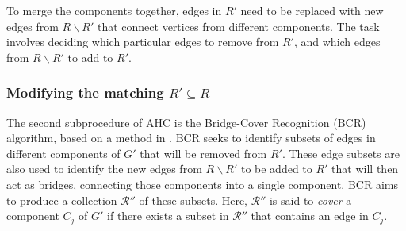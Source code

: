 \documentclass[a4paper,11pt,authoryear]{elsarticle}
\begin{document}
To merge the components together, edges in $R'$ need to be replaced with new edges from $R \backslash R'$ that connect vertices from different components. The task involves deciding which particular edges to remove from $R'$, and which edges from $R \backslash R'$ to add to $R'$.

\subsubsection{Modifying the matching $R' \subseteq R$}
\label{subsub:bcr}
\noindent The second subprocedure of AHC is the Bridge-Cover Recognition (BCR) algorithm, based on a method in \cite{becker2010}. BCR seeks to identify subsets of edges in different components of $G'$ that will be removed from $R'$. These edge subsets are also used to identify the new edges from $R \backslash R'$ to be added to $R'$ that will then act as bridges, connecting those components into a single component. BCR aims to produce a collection $\mathcal{R}''$ of these subsets. Here, $\mathcal{R}''$ is said to \emph{cover} a component $C_j$ of $G'$ if there exists a subset in $\mathcal{R}''$ that contains an edge in $C_j$.
\end{document}
